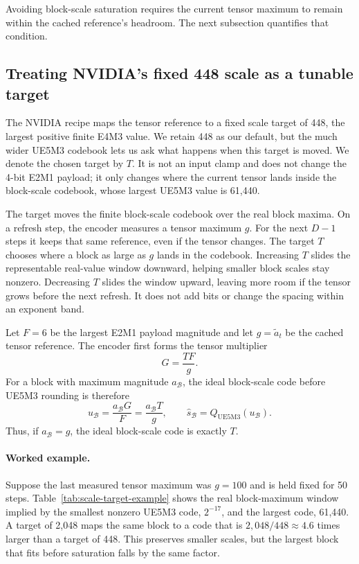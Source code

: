 \documentclass[11pt]{article}
\newcommand{\ue}{UE5M3}
\begin{document}
Avoiding block-scale saturation requires the current tensor maximum to remain
within the cached reference's headroom.  The next subsection quantifies that
condition.

\subsection{Treating NVIDIA's fixed 448 scale as a tunable target}

The NVIDIA recipe maps the tensor reference to a fixed scale target of 448,
the largest positive finite E4M3 value.  We retain 448 as our default, but the
much wider \ue{} codebook lets us ask what happens when this target is moved.
We denote the chosen target by $T$.  It is not an input clamp and does not
change the 4-bit E2M1 payload; it only changes where the current tensor lands
inside the block-scale codebook, whose largest \ue{} value is 61,440.

The target moves the finite block-scale codebook over the real block maxima.
On a refresh step, the encoder measures a tensor maximum $g$.  For the next
$D-1$ steps it keeps that same reference, even if the tensor changes.  The
target $T$ chooses where a block as large as $g$ lands in the codebook.
Increasing $T$ slides the representable real-value window downward, helping
smaller block scales stay nonzero.  Decreasing $T$ slides the window upward,
leaving more room if the tensor grows before the next refresh.  It does not add
bits or change the spacing within an exponent band.

Let $F=6$ be the largest E2M1 payload magnitude and let $g=\widetilde a_t$ be
the cached tensor reference.  The encoder first forms the tensor multiplier
\begin{equation}
  G=\frac{TF}{g}.
\end{equation}
For a block with maximum magnitude $a_{\mathcal B}$, the ideal block-scale code before
\ue{} rounding is therefore
\begin{equation}
  u_{\mathcal B}=\frac{a_{\mathcal B}G}{F}=\frac{a_{\mathcal B}T}{g},
  \qquad
  \widehat{s}_{\mathcal B}=Q_{\mathrm{UE5M3}}(u_{\mathcal B}).
  \label{eq:scale-target}
\end{equation}
Thus, if $a_{\mathcal B}=g$, the ideal block-scale code is exactly $T$.

\paragraph{Worked example.}
Suppose the last measured tensor maximum was $g=100$ and is held fixed for 50
steps.  Table~\ref{tab:scale-target-example} shows the real block-maximum window
implied by the smallest nonzero \ue{} code, $2^{-17}$, and the largest code,
61,440.  A target of 2,048 maps the same block to a code that is
$2{,}048/448\approx4.6$ times larger than a target of 448.  This preserves
smaller scales, but the largest block that fits before saturation falls by the
same factor.
\end{document}
